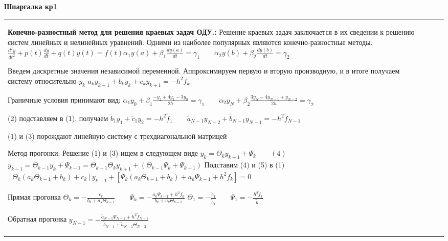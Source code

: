 \documentclass[a4paper,2pt]{article}
\begin{document}
\thispagestyle{empty}
\fontsize{4pt}{3pt}\selectfont

\begin{center}
  {\large\bf Шпаргалка кр1}
\end{center}

\vspace{0.5em}

\setlength{\extrarowheight}{1pt} %
\begin{tabular}{|p{}|p{}|p{}|} %
\hline

\textbf{Конечно-разностный метод для решения краевых задач ОДУ.:}
Решение краевых задач заключается в их сведении к решению систем линейных и нелинейных уравнений. Одними из наиболее популярных являются конечно-разностные методы.
$\frac{d^2y}{dt^2} + p(t)\frac{dy}{dt} + q(t)y(t) = f(t)$$\alpha_1 y(a) + \beta_1 \frac{dy(a)}{dt} = \gamma_1\qquad \alpha_2 y(b) + \beta_2 \frac{dy(b)}{dt} = \gamma_2$

Введем дискретные значения независимой переменной. Аппроксимируем первую и вторую производную, и в итоге получаем систему относительно $y_k$
$a_ky_{k-1}+b_ky_k+c_ky_{k+1}=-h^2f_k \tag{1}$

Граничные условия принимают вид:
$\alpha_1y_0+\beta_1\frac{-y_2+4y_1-3y_0}{2h}=\gamma_1\qquad \alpha_2y_N+\beta_2\frac{3y_N-4y_{N-1}+y_{N-2}}{2h}=\gamma_2 \tag{2}$

(2) подставляем в (1), получаем
$\tilde{b}_1y_1+\tilde{c}_1y_2=-h^2\tilde{f}_1\qquad  \tilde{a}_{N-1}y_{N-2}+\tilde{b}_{N-1}y_{N-1}=-h^2\tilde{f}_{N-1} \tag{3}$

(1) и (3) порождают линейную систему с трехдиагональной матрицей

Метод прогонки:
Решение (1) и (3) ищем в следующем виде
$y_k=\Theta_ky_{k+1}+\Psi_k \qquad(4)$ $y_{k-1}=\Theta_{k-1}y_k+\Psi_{k-1}=\Theta_{k-1}\Theta_ky_{k+1}+(\Theta_{k-1}\Psi_k+\Psi_{k-1}) \tag{5}$
Подставим (4) и (5) в (1)
$[\Theta_k(a_k\Theta_{k-1}+b_k)+c_k]y_{k+1}+[\Psi_k(a_k\Theta_{k-1}+b_k)+a_k\Psi_{k-1}+h^2f_k]=0$

Прямая прогонка
$\Theta_k=-\frac{c_k}{b_k+a_k\Theta_{k-1}} \qquad \Psi_k=-\frac{a_k\Psi_{k-1}+h^2f_k}{b_k+a_k\Theta_{k-1}}$  $\Theta_1=-\frac{\tilde{c}_1}{\tilde{b}_1} \qquad \Psi_1=-\frac{h^2\tilde{f}_1}{\tilde{b}_1}  \tag{6}$

Обратная прогонка
$y_{N-1}=-\frac{\tilde{a}_{N-1}\Psi_{N-2}+h^2\tilde{f}_{N-1}}{\tilde{b}_{N-1}+\tilde{a}_{N-1}\Theta_{N-2}}  \tag{7}$



\end{tabular}
\end{document}
